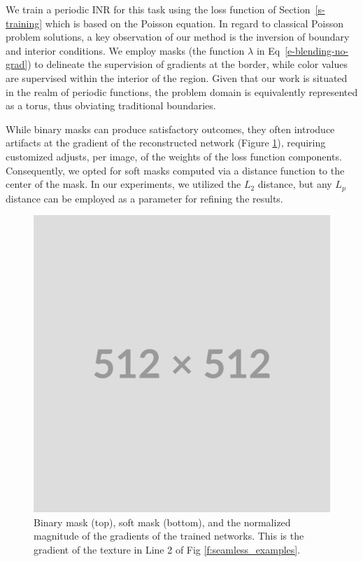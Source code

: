 We train a periodic INR for this task using the loss function of Section~\ref{s-training} which is based on the Poisson equation. In regard to classical Poisson problem solutions, a key observation of our method is the inversion of boundary and interior conditions. 
We employ masks (the function $\lambda$ in Eq~\ref{e-blending-no-grad}) to delineate the supervision of gradients at the border, while color values are supervised within the interior of the region. Given that our work is situated in the realm of periodic functions, the problem domain is equivalently represented as a torus, thus obviating traditional boundaries.


While binary masks can produce satisfactory outcomes, they often introduce artifacts at the gradient of the reconstructed network (Figure \ref{f:training_masks}), requiring customized adjusts, per image, of the weights of the loss function components. Consequently, we opted for soft masks computed via a distance function to the center of the mask. 
In our experiments, we utilized the $L_2$ distance, but any $L_p$ distance can be employed as a parameter for refining the results. 
\begin{figure}[!h]
\centering
\includegraphics[width=0.90\linewidth]{img/placeholder512.png}


\caption{Binary mask (top), soft mask (bottom), and the normalized magnitude of the gradients of the trained networks. This is the gradient of the texture in Line 2 of Fig \ref{f:seamless_examples}.}
\label{f:training_masks}
\end{figure}


